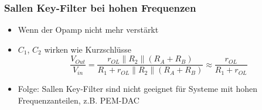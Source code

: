 \subsubsection{Sallen Key-Filter bei hohen Frequenzen}
\begin{itemize}
  \item Wenn der Opamp nicht mehr verstärkt
  \item $C_1$, $C_2$ wirken wie Kurzschlüsse
  \begin{equation}
  \frac{V_{Out}}{V_{in}}=\frac{r_{OL}\parallel R_2\parallel
  (R_{A}+R_{B})}{R_1+r_{OL}\parallel R_2\parallel (R_{A}+R_{B})}\approx
  \frac{r_{OL}}{R_1+r_{OL}}
  \end{equation}
  \item Folge: Sallen Key-Filter sind nicht geeignet für Systeme mit hohen
  Frequenzanteilen, z.B. PEM-DAC
\end{itemize}


